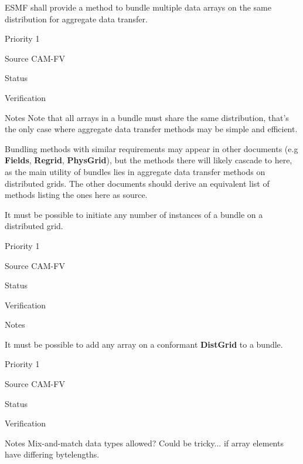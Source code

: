 
ESMF shall provide a method to bundle multiple data arrays on the same
distribution for aggregate data transfer.

\begin{reqlist}
\item[Priority] 1
\item[Source] CAM-FV
\item[Status]
\item[Verification]
\item[Notes] Note that all arrays in a bundle must share the same
  distribution, that's the only case where aggregate data transfer
  methods may be simple and efficient.
  
  Bundling methods with similar requirements may appear in other
  documents (e.g \textbf{Fields}, \textbf{Regrid}, \textbf{PhysGrid}),
  but the methods there will likely cascade to here, as the main
  utility of bundles lies in aggregate data transfer methods on
  distributed grids. The other documents should derive an equivalent
  list of methods listing the ones here as source.
\end{reqlist}


It must be possible to initiate any number of instances of a bundle on
a distributed grid.

\begin{reqlist}
\item[Priority] 1
\item[Source] CAM-FV
\item[Status]
\item[Verification]
\item[Notes]
\end{reqlist}


It must be possible to add any array on a conformant \textbf{DistGrid}
to a bundle.

\begin{reqlist}
\item[Priority] 1
\item[Source] CAM-FV
\item[Status]
\item[Verification]
\item[Notes] Mix-and-match data types allowed? Could be tricky... if
  array elements have differing bytelengths.
\end{reqlist}


